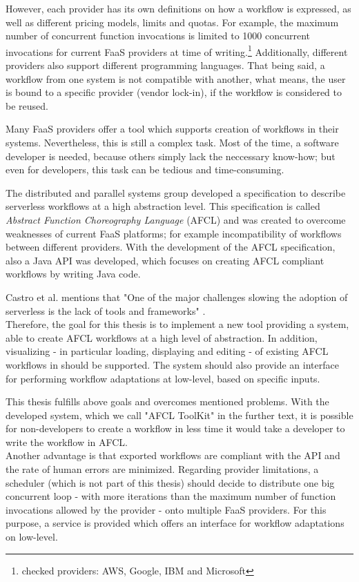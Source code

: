 \documentclass[a4paper,top=25mm,bottom=25mm,12pt,pdftex,halfparskip,twoside,bibtotoc,numbers=noenddot]{scrbook}
\begin{document}
However, each provider has its own definitions on how a workflow is expressed, as well as different pricing models, limits and quotas. For example, the maximum number of concurrent function invocations is limited to 1000 concurrent invocations for current FaaS providers at time of writing.\footnote{checked providers: AWS, Google, IBM and Microsoft}
Additionally, different providers also support different programming languages. That being said, a workflow from one system is not compatible with another, what means, the user is bound to a specific provider (vendor lock-in), if the workflow is considered to be reused.

Many FaaS providers offer a tool which supports creation of workflows in their systems. Nevertheless, this is still a complex task. Most of the time, a software developer is needed, because others simply lack the neccessary know-how; but even for developers, this task can be tedious and time-consuming.

The distributed and parallel systems group developed a specification to describe serverless workflows at a high abstraction level. This specification is called \emph{Abstract Function Choreography Language} (AFCL) and was created to overcome weaknesses  of current FaaS platforms; for example incompatibility of workflows between different providers. With the development of the AFCL specification, also a Java API was developed, which focuses on creating AFCL compliant workflows by writing Java code.

Castro et al. mentions that "One of the major challenges slowing the adoption of serverless is the lack of tools and frameworks" \cite{articles-rise-of-serverless-castro}.\\
Therefore, the goal for this thesis is to implement a new tool providing a system, able to create AFCL workflows at a high level of abstraction. In addition, visualizing - in particular loading, displaying and editing - of existing AFCL workflows in should be supported.
The system should also provide an interface for performing workflow adaptations at low-level, based on specific inputs.

This thesis fulfills above goals and overcomes mentioned problems.
With the developed system, which we call "AFCL ToolKit" in the further text, it is possible for non-developers to create a workflow in less time it would take a developer to write the workflow in AFCL.\\
Another advantage is that exported workflows are compliant with the API and the rate of human errors are minimized.
Regarding provider limitations, a scheduler (which is not part of this thesis) should decide to distribute one big concurrent loop - with more iterations than the maximum number of function invocations allowed by the provider - onto multiple FaaS providers. For this purpose, a service is provided which offers an interface for workflow adaptations on low-level.
\end{document}
